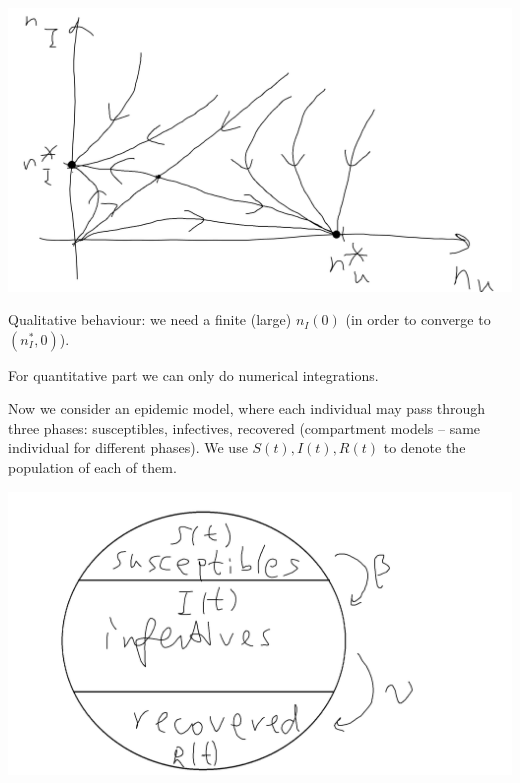 \documentclass[a4paper]{article}
\begin{document}
\includegraphics[scale=0.5]{image/Bio_04.png}

Qualitative behaviour: we need a finite (large) $n_I(0)$ (in order to converge to $(n^*_I,0)$).

For quantitative part we can only do numerical integrations.

Now we consider an epidemic model, where each individual may pass through three phases: susceptibles, infectives, recovered (compartment models -- same individual for different phases). We use $S(t),I(t),R(t)$ to denote the population of each of them. 

\includegraphics[scale=0.5]{image/Bio_05.png}
\end{document}
